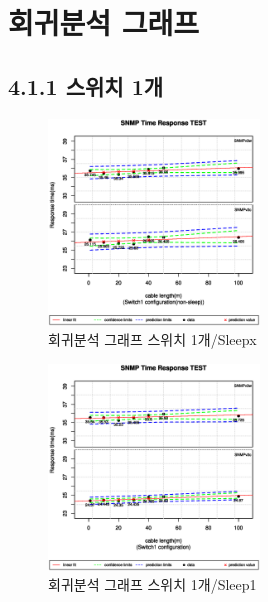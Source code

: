 \documentclass[11pt
  , a4paper
  , article
  , oneside
]{memoir}
\begin{document}
\section{회귀분석 그래프}

\subsection{4.1.1 스위치 1개}
 \begin{figure}[!htb]
  \centering
  \includegraphics[width=0.5\textwidth]{./images/s1sx.eps}
  \caption{회귀분석 그래프 스위치 1개/Sleepx}
\end{figure}
 \begin{figure}[!htb]
  \centering
  \includegraphics[width=0.5\textwidth]{./images/s1s1.eps}
  \caption{회귀분석 그래프 스위치 1개/Sleep1}
\end{figure}

\clearpage
\end{document}
